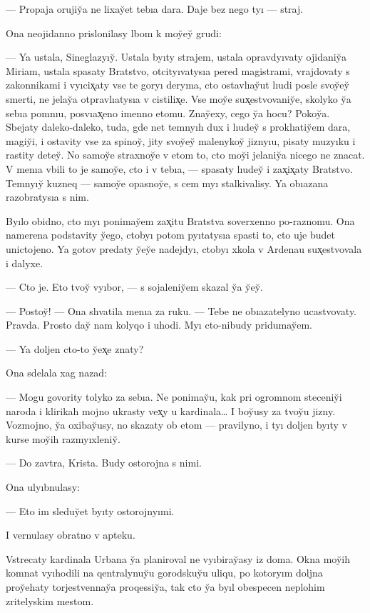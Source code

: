 \documentclass[10pt]{book}
\begin{document}
— Propaja orujiy̆a ne lixay̆et tebıa dara. Daje bez nego tyı — straj.

Ona neojidanno prislonilasy lbom k moy̆ey̆ grudi:

— Ya ustala, Sineglazyıy̆. Ustala byıty strajem, ustala opravdyıvaty ojidaniy̆a Miriam, ustala spasaty Bratstvo, otcityıvatysıa pered magistrami, vrajdovaty s zakonnikami i vyıcix̨aty vse te goryı deryma, cto ostavlıay̆ut lıudi posle svoy̆ey̆ smerti, ne jelay̆a otpravlıatysıa v cistilix̨e. Vse moy̆e sux̨estvovaniy̆e, skolyko y̆a sebıa pomnıu, posvıax̨eno imenno etomu. Znay̆exy, cego y̆a hocu? Pokoy̆a. Sbejaty daleko-daleko, tuda, gde net temnyıh dux i lıudey̆ s proklıatiy̆em dara, magiy̆i, i ostavity vse za spinoy̆, jity svoy̆ey̆ malenykoy̆ jiznyıu, pisaty muzyıku i rastity detey̆. No samoy̆e straxnoy̆e v etom to, cto moy̆i jelaniy̆a nicego ne znacat. V menıa vbili to je samoy̆e, cto i v tebıa, — spasaty lıudey̆ i zax̨ix̨aty Bratstvo. Temnyıy̆ kuzneq — samoy̆e opasnoy̆e, s cem myı stalkivalisy. Ya obıazana razobratysıa s nim.

Byılo obidno, cto myı ponimay̆em zax̨itu Bratstva soverxenno po-raznomu. Ona namerena podstavity y̆ego, ctobyı potom pyıtatysıa spasti to, cto uje budet unictojeno. Ya gotov predaty y̆ey̆e nadejdyı, ctobyı xkola v Ardenau sux̨estvovala i dalyxe.

— Cto je. Eto tvoy̆ vyıbor, — s sojaleniy̆em skazal y̆a y̆ey̆.

— Postoy̆! — Ona shvatila menıa za ruku. — Tebe ne obıazatelyno ucastvovaty. Pravda. Prosto day̆ nam kolyqo i uhodi. Myı cto-nibudy pridumay̆em.

— Ya doljen cto-to y̆ex̨e znaty?

Ona sdelala xag nazad:

— Mogu govority tolyko za sebıa. Ne ponimay̆u, kak pri ogromnom steceniy̆i naroda i klirikah mojno ukrasty vex̨y u kardinala… I boy̆usy za tvoy̆u jizny. Vozmojno, y̆a oxibay̆usy, no skazaty ob etom — pravilyno, i tyı doljen byıty v kurse moy̆ih razmyıxleniy̆.

— Do zavtra, Krista. Budy ostorojna s nimi.

Ona ulyıbnulasy:

— Eto im sleduy̆et byıty ostorojnyımi.

I vernulasy obratno v apteku.

Vstrecaty kardinala Urbana y̆a planiroval ne vyıbiray̆asy iz doma. Okna moy̆ih komnat vyıhodili na qentralynuy̆u gorodskuy̆u uliqu, po kotoryım doljna proy̆ehaty torjestvennay̆a proqessiy̆a, tak cto y̆a byıl obespecen neplohim zritelyskim mestom.
\end{document}
